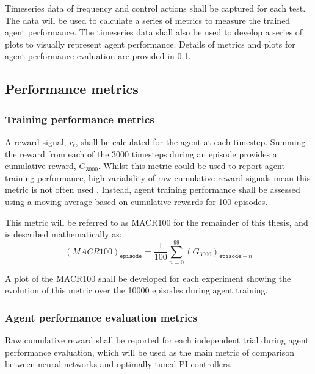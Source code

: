 Timeseries data of frequency and control actions shall be captured for each test. The data will be used to calculate a series of metrics to measure the trained agent performance. The timeseries data shall also be used to develop a series of plots to visually represent agent performance. Details of metrics and plots for agent performance evaluation are provided in \ref{sec:agent_performance}.


\subsection{Performance metrics}\label{sec:agent_performance}
\subsubsection{Training performance metrics}
A reward signal, $r_t$, shall be calculated for the agent at each timestep. Summing the reward from each of the 3000 timesteps during an episode provides a cumulative reward, $G_{3000}$. Whilst this metric could be used to report agent training performance, high variability of raw cumulative reward signals mean this metric is not often used \cite{Henderson2017}. Instead, agent training performance shall be assessed using a moving average based on cumulative rewards for 100 episodes.

This metric will be referred to as MACR100 for the remainder of this thesis, and is described mathematically as:
\begin{equation}
	(MACR100)_{\texttt{episode}} = \frac{1}{100} \sum_{n = 0}^{99} (G_{3000})_{\texttt{episode} - n}
\end{equation}

A plot of the MACR100 shall be developed for each experiment showing the evolution of this metric over the 10000 episodes during agent training.

\subsubsection{Agent performance evaluation metrics}
Raw cumulative reward shall be reported for each independent trial during agent performance evaluation, which will be used as the main metric of comparison between neural networks and optimally tuned PI controllers.

